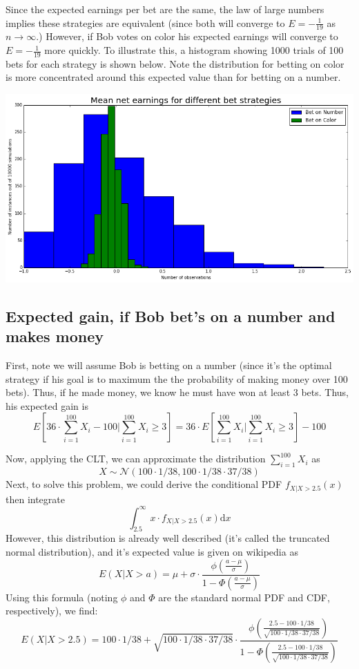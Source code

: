 \documentclass[paper=a4, fontsize=11pt]{scrartcl} %
\numberwithin{equation}{section} %
\numberwithin{figure}{section} %
\numberwithin{table}{section} %
\begin{document}
Since the expected earnings per bet are the same, the law of large numbers implies these strategies are equivalent (since both will converge to $E = -\frac{1}{19}$ as $n \to \infty$.) However, if Bob votes on color his expected earnings will converge to $E = -\frac{1}{19}$ more quickly. To illustrate this, a histogram showing 1000 trials of 100 bets for each strategy is shown below. Note the distribution for betting on color is more concentrated around this expected value than for betting on a number.

\includegraphics[scale=0.5]{Q1c_fig}

 \subsection{Expected gain, if Bob bet's on a number and makes money}
 
 First, note we will assume Bob is betting on a number (since it's the optimal strategy if his goal is to maximum the the probability of making money over 100 bets). Thus, if he made money, we know he must have won at least 3 bets. Thus, his expected gain is
\[E\left[36\cdot \sum_{i = 1}^{100} X_i -100 \big| \sum_{i = 1}^{100} X_i \geq 3\right] = 36 \cdot E\left[ \sum_{i = 1}^{100} X_i  \big| \sum_{i = 1}^{100} X_i \geq 3\right] - 100 \]

Now, applying the CLT, we can approximate the distribution $\sum_{i = 1}^{100} X_i$ as
\[X \sim \mathcal{N}(100\cdot 1/38, 100\cdot1/38\cdot37/38)\]
Next, to solve this problem, we could derive the conditional PDF $f_{X|X>2.5}(x)$ then integrate
\[\int_{2.5}^{\infty} x \cdot f_{X|X>2.5}(x) \textrm{d}x\]
However, this distribution is already well described (it's called the truncated normal distribution), and it's expected value is given on wikipedia as
\[E(X | X>a) = \mu + \sigma \cdot \frac{\phi(\frac{a - \mu}{\sigma})}{1 - \Phi(\frac{a - \mu}{\sigma})}\]
Using this formula (noting $\phi$ and $\Phi$ are the standard normal PDF and CDF, respectively), we find:
\[E(X | X>2.5) = 100\cdot1/38 + \sqrt{100\cdot1/38\cdot37/38} \cdot \frac{\phi\left(\frac{2.5 - 100\cdot1/38}{\sqrt{100\cdot1/38\cdot37/38}}\right)}{1 - \Phi\left(\frac{2.5 - 100\cdot1/38}{\sqrt{100\cdot1/38\cdot37/38}}\right)}\]
\end{document}
